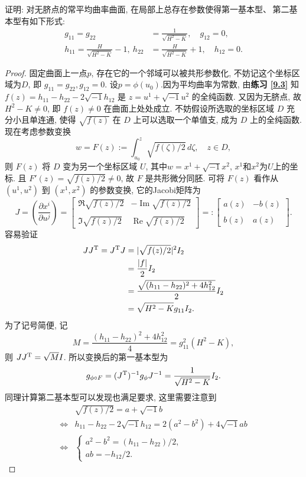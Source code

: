 	\begin{excise}\label{9.4}
		证明: 对无脐点的常平均曲率曲面, 在局部上总存在参数使得第一基本型、\,第二基本型有如下形式: 
		\begin{align*}
		g_{11} = g_{22} &= \frac{1}{\sqrt{H^2 - K}},\quad g_{12} = 0, \\
		h_{11} = \frac{H}{\sqrt{H^2 - K}} - 1,\ h_{22} & = \frac{H}{\sqrt{H^2 - K}} + 1,\quad h_{12} = 0.
		\end{align*}
	\end{excise}
	\begin{proof}
		固定曲面上一点$p$, 存在它的一个邻域可以被共形参数化, 不妨记这个坐标区域为$D$, 即 $g_{11} = g_{22},  g_{12} = 0$. 设$p = \phi(u_0)$.因为平均曲率为常数, 由\textbf{练习 \ref{9.3}} 知 $f(z) = h_{11} - h_{22} - 2\sqrt{-1}h_{12}$ 是 $z = u^1 + \sqrt{-1}u^2$ 的全纯函数. 又因为无脐点, 故 $H^2 - K \neq 0$, 即 $f(z) \neq 0$ 在曲面上处处成立. 不妨假设所选取的坐标区域 $D$ 充分小且单连通, 使得 $\sqrt{f(z)}$ 在 $D$ 上可以选取一个单值支, 成为 $D$ 上的全纯函数.现在考虑参数变换 
		\[w = F(z) := \int_{u_0}^z \sqrt{f(\zeta)/2} \, d \zeta, \quad z\in D ,\]
		则 $F(z)$ 将 $D$ 变为另一个坐标区域 $U$, 其中$w = x^1 + \sqrt{-1}x^2$, $x^1$和$x^2$为$U$上的坐标.
		且 $F'(z) = \sqrt{f(z)/2} \neq 0$, 故 $F$ 是共形微分同胚. 可将 $F(z)$ 看作从 $(u^1, u^2)$ 到 $(x^1, x^2)$ 的参数变换, 它的Jacobi矩阵为 
		$$
		J  = \left(\frac{\partial x^i}{\partial u^j}\right) = \begin{bmatrix}
			\Re\sqrt{f(z)/2} & -\operatorname{Im}\sqrt{f(z)/2} \\ \\
			\Im\sqrt{f(z)/2} & \operatorname{Re}\sqrt{f(z)/2}
		\end{bmatrix} =: \begin{bmatrix}
			a(z) & -b(z) \\ \\
			b(z) & a(z)
		\end{bmatrix}.
		$$
		容易验证 
		$$
		\begin{aligned}
			JJ^{\T} = J^{\T}J &= |\sqrt{f(z)/2}|^{2}I_{2} \\
			&= \frac{|f|}{2}I_{2} \\
			&= \frac{\sqrt{(h_{11} - h_{22})^2 + 4h_{12}^2}}{2}I_{2} \\
			&= \sqrt{H^2 - K}g_{11}I_{2}.
		\end{aligned}
		$$
		为了记号简便, 记 
		$$
		M = \frac{(h_{11} - h_{22})^2 + 4h_{12}^2}{4} = g_{11}^2(H^2 - K),
		$$
		则 $JJ^{\rm T} = \sqrt{M}I$.
		所以变换后的第一基本型为
		\[
		g_{\phi\circ F} = (J^{\T})^{-1} g_{\phi} J^{-1} = \frac{1}{\sqrt{H^2 - K}}I_{2}.
		\]
		同理计算第二基本型可以发现也满足要求, 这里需要注意到
		\begin{align*}
			&\sqrt{f(z)/2} = a + \sqrt{-1}b \\
			\Leftrightarrow &h_{11} - h_{22} - 2\sqrt{-1}h_{12} = 2(a^2 - b^2) + 4\sqrt{-1}ab \\
			\Leftrightarrow & \begin{cases}
				a^2 - b^2 = (h_{11} - h_{22})/2, \\
				ab = -h_{12}/2.
			\end{cases}
		\end{align*}
	\end{proof}
